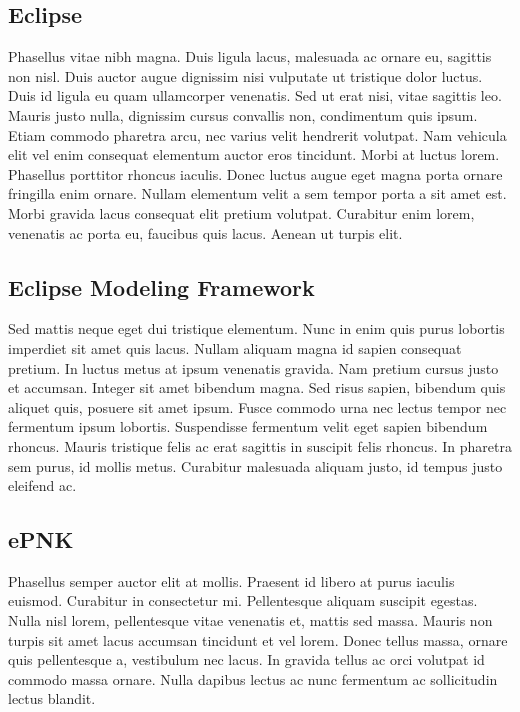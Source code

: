 \subsection{Eclipse}
Phasellus vitae nibh magna. Duis ligula lacus, malesuada ac ornare eu, sagittis non nisl. Duis auctor augue dignissim nisi vulputate ut tristique dolor luctus. Duis id ligula eu quam ullamcorper venenatis. Sed ut erat nisi, vitae sagittis leo. Mauris justo nulla, dignissim cursus convallis non, condimentum quis ipsum. Etiam commodo pharetra arcu, nec varius velit hendrerit volutpat. Nam vehicula elit vel enim consequat elementum auctor eros tincidunt. Morbi at luctus lorem. Phasellus porttitor rhoncus iaculis. Donec luctus augue eget magna porta ornare fringilla enim ornare. Nullam elementum velit a sem tempor porta a sit amet est. Morbi gravida lacus consequat elit pretium volutpat. Curabitur enim lorem, venenatis ac porta eu, faucibus quis lacus. Aenean ut turpis elit.

\subsection{Eclipse Modeling Framework}
Sed mattis neque eget dui tristique elementum. Nunc in enim quis purus lobortis imperdiet sit amet quis lacus. Nullam aliquam magna id sapien consequat pretium. In luctus metus at ipsum venenatis gravida. Nam pretium cursus justo et accumsan. Integer sit amet bibendum magna. Sed risus sapien, bibendum quis aliquet quis, posuere sit amet ipsum. Fusce commodo urna nec lectus tempor nec fermentum ipsum lobortis. Suspendisse fermentum velit eget sapien bibendum rhoncus. Mauris tristique felis ac erat sagittis in suscipit felis rhoncus. In pharetra sem purus, id mollis metus. Curabitur malesuada aliquam justo, id tempus justo eleifend ac.

\subsection{ePNK}
Phasellus semper auctor elit at mollis. Praesent id libero at purus iaculis euismod. Curabitur in consectetur mi. Pellentesque aliquam suscipit egestas. Nulla nisl lorem, pellentesque vitae venenatis et, mattis sed massa. Mauris non turpis sit amet lacus accumsan tincidunt et vel lorem. Donec tellus massa, ornare quis pellentesque a, vestibulum nec lacus. In gravida tellus ac orci volutpat id commodo massa ornare. Nulla dapibus lectus ac nunc fermentum ac sollicitudin lectus blandit.
